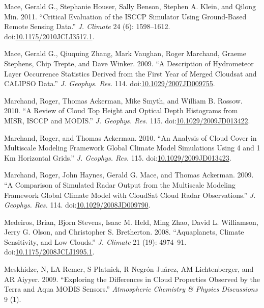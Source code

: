 \hypertarget{ref-maceux5fetux5falux5f2011}{}
Mace, Gerald G., Stephanie Houser, Sally Benson, Stephen A. Klein, and
Qilong Min. 2011. ``Critical Evaluation of the ISCCP Simulator Using
Ground-Based Remote Sensing Data.'' \emph{J. Climate} 24 (6):
1598--1612.
doi:\href{https://doi.org/10.1175/2010JCLI3517.1}{10.1175/2010JCLI3517.1}.

\hypertarget{ref-maceux5fetux5falux5f2009}{}
Mace, Gerald G., Qiuquing Zhang, Mark Vaughan, Roger Marchand, Graeme
Stephens, Chip Trepte, and Dave Winker. 2009. ``A Description of
Hydrometeor Layer Occurrence Statistics Derived from the First Year of
Merged Cloudsat and CALIPSO Data.'' \emph{J. Geophys. Res.} 114.
doi:\href{https://doi.org/10.1029/2007JD009755}{10.1029/2007JD009755}.

\hypertarget{ref-marchandux5fetux5falux5f2010}{}
Marchand, Roger, Thomas Ackerman, Mike Smyth, and William B. Rossow.
2010. ``A Review of Cloud Top Height and Optical Depth Histograms from
MISR, ISCCP and MODIS.'' \emph{J. Geophys. Res.} 115.
doi:\href{https://doi.org/10.1029/2009JD013422}{10.1029/2009JD013422}.

\hypertarget{ref-marchandux5fandux5fackermanux5f2010}{}
Marchand, Roger, and Thomas Ackerman. 2010. ``An Analysis of Cloud Cover
in Multiscale Modeling Framework Global Climate Model Simulations Using
4 and 1 Km Horizontal Grids.'' \emph{J. Geophys. Res.} 115.
doi:\href{https://doi.org/10.1029/2009JD013423}{10.1029/2009JD013423}.

\hypertarget{ref-marchandux5fetux5falux5f2009}{}
Marchand, Roger, John Haynes, Gerald G. Mace, and Thomas Ackerman. 2009.
``A Comparison of Simulated Radar Output from the Multiscale Modeling
Framework Global Climate Model with CloudSat Cloud Radar Observations.''
\emph{J. Geophys. Res.} 114.
doi:\href{https://doi.org/10.1029/2008JD009790}{10.1029/2008JD009790}.

\hypertarget{ref-medeirosux5fetux5falux5f2008}{}
Medeiros, Brian, Bjorn Stevens, Isaac M. Held, Ming Zhao, David L.
Williamson, Jerry G. Olson, and Christopher S. Bretherton. 2008.
``Aquaplanets, Climate Sensitivity, and Low Clouds.'' \emph{J. Climate}
21 (19): 4974--91.
doi:\href{https://doi.org/10.1175/2008JCLI1995.1}{10.1175/2008JCLI1995.1}.

\hypertarget{ref-meskhidzeux5fetux5falux5f2009}{}
Meskhidze, N, LA Remer, S Platnick, R Negrón Juárez, AM Lichtenberger,
and AR Aiyyer. 2009. ``Exploring the Differences in Cloud Properties
Observed by the Terra and Aqua MODIS Sensors.'' \emph{Atmospheric
Chemistry \& Physics Discussions} 9 (1).


